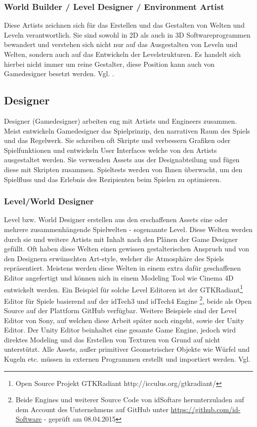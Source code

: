 \documentclass[pagesize, paper=a4, fontsize=12pt, titlepage=true, headings=small, headnosepline, abstractoff, liststotoc, nochapterprefix, plainheadsepline, twoside]{scrreprt}
\begin{document}
\subsubsection{World Builder / Level Designer / Environment Artist}
Diese Artists zeichnen sich für das Erstellen und das Gestalten von Welten und Leveln verantwortlich. Sie sind sowohl in 2D als auch in 3D Softwareprogrammen bewandert und verstehen sich nicht nur auf das Ausgestalten von Leveln und Welten, sondern auch auf das Entwickeln der Levelstrukturen. Es handelt sich hierbei nicht immer um reine Gestalter, diese Position kann auch von Gamedesigner besetzt werden. Vgl. \parencite[S. 24]{Chandler2006}.

\subsection{Designer}
Designer (Gamedesigner) arbeiten eng mit Artists und Engineers zusammen. Meist entwickeln Gamedesigner das Spielprinzip, den narrativen Raum des Spiels und das Regelwerk. Sie schreiben oft Skripte und verbessern Grafiken oder Spielfunktionen und entwickeln User Interfaces welche von den Artists ausgestaltet werden. Sie verwenden Assets aus der Designabteilung und fügen diese mit Skripten zusammen. Spieltests werden von Ihnen überwacht, um den Spielfluss und das Erlebnis des Rezipienten beim Spielen zu optimieren.

\subsubsection{Level/World Designer}
Level bzw. World Designer erstellen aus den erschaffenen Assets eine oder mehrere zusammenhängende Spielwelten - sogenannte Level. Diese Welten werden durch sie und weitere Artists mit Inhalt nach den Plänen der Game Designer gefüllt. Oft haben diese Welten einen gewissen gestalterischen Anspruch und von den Designern erwünschten Art-style, welcher die Atmosphäre des Spiels repräsentiert. Meistens werden diese Welten in einem extra dafür geschaffenen Editor angefertigt und können nich in einem Modeling Tool wie Cinema 4D entwickelt werden. Ein Beispiel für solche Level Editoren ist der GTKRadiant\footnote{Open Source Projekt GTKRadiant http://icculus.org/gtkradiant/} Editor für Spiele basierend auf der idTech3 und idTech4  Engine \footnote{Beide Engines und weiterer Source Code von idSoftare herunterzuladen auf dem Account des Unternehmens auf GitHub unter \url{https://github.com/id-Software} - geprüft am 08.04.2015}, beide als Open Source auf der Plattform GitHub verfügbar. Weitere Beispiele sind der Level Editor von Sony, auf welchen diese Arbeit später noch eingeht, sowie der Unity Editor. Der Unity Editor beinhaltet eine gesamte Game Engine, jedoch wird direktes Modeling und das Erstellen von Texturen von Grund auf nicht unterstützt. Alle Assets, außer primitiver Geometrischer Objekte wie Würfel und Kugeln etc. müssen in externen Programmen erstellt und importiert werden. Vgl. \parencite[S. 31 ]{Chandler2006}
\end{document}
